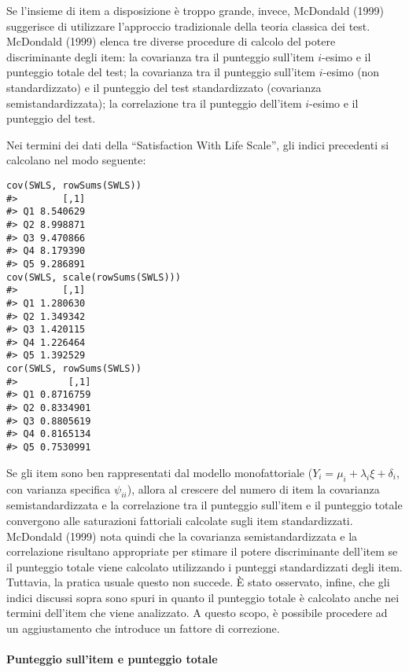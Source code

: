 Se l'insieme di item a disposizione è troppo grande, invece, McDondald (1999) suggerisce di utilizzare l'approccio tradizionale della teoria classica dei test. 
McDondald (1999) elenca tre diverse procedure di calcolo del potere discriminante degli item:  
la covarianza tra il punteggio sull'item $i$-esimo e il  punteggio totale del test;  
 la covarianza tra il punteggio sull'item $i$-esimo (non standardizzato) e il punteggio del test standardizzato (covarianza semistandardizzata);  la correlazione tra il punteggio dell'item $i$-esimo e il punteggio del test.   

\begin{exmp}
Nei termini dei dati della ``Satisfaction With Life Scale'',
    gli indici precedenti si calcolano nel modo seguente: 
\begin{lstlisting}
cov(SWLS, rowSums(SWLS))
#>        [,1]
#> Q1 8.540629
#> Q2 8.998871
#> Q3 9.470866
#> Q4 8.179390
#> Q5 9.286891
cov(SWLS, scale(rowSums(SWLS)))
#>        [,1]
#> Q1 1.280630
#> Q2 1.349342
#> Q3 1.420115
#> Q4 1.226464
#> Q5 1.392529
cor(SWLS, rowSums(SWLS))
#>         [,1]
#> Q1 0.8716759
#> Q2 0.8334901
#> Q3 0.8805619
#> Q4 0.8165134
#> Q5 0.7530991
\end{lstlisting}

\end{exmp}

Se gli item sono ben rappresentati dal modello monofattoriale ($Y_i = \mu_i + \lambda_i \xi + \delta_i$, con varianza specifica $\psi_{ii}$), allora al crescere del numero di item la covarianza semistandardizzata e la correlazione tra il punteggio sull'item e il punteggio totale convergono alle saturazioni fattoriali calcolate sugli
item standardizzati.  McDondald (1999) nota quindi che la covarianza
    semistandardizzata e la correlazione risultano appropriate per
    stimare il potere discriminante dell'item se il punteggio totale
    viene calcolato utilizzando i punteggi standardizzati
    degli item. 
   Tuttavia, la pratica usuale questo non succede. 
È stato osservato, infine, che gli indici discussi sopra sono spuri in
    quanto il punteggio totale  è calcolato anche nei termini
    dell'item che viene analizzato. A questo scopo, è possibile procedere ad un aggiustamento che introduce
    un fattore di correzione. 
    

\paragraph{Punteggio sull'item e punteggio totale}


